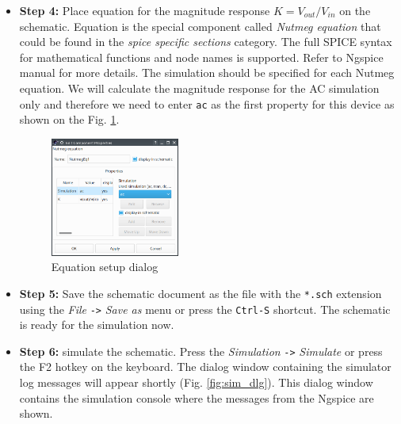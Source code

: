 \documentclass[a4paper,12pt]{article}
\begin{document}
\begin{itemize}
 \item \textbf{Step 4:} Place equation for the magnitude response $K=V_{out}/V_{in}$ on the schematic. Equation is the special component called \emph{Nutmeg equation} that could be found in the \emph{spice specific sections} category. The full SPICE syntax for mathematical functions and node names is supported. Refer to Ngspice manual for more details. The simulation should be specified for each Nutmeg equation. We will calculate the magnitude response for the AC simulation only and therefore we need to enter \verb|ac| as the first property for this device as shown on the Fig. \ref{fig:eq}.
  \begin{figure}[!ht]
  \begin{center}
    \includegraphics[width=0.4\textwidth]{img/nutmeg_eq.png}
  \end{center}
  \caption{Equation setup dialog} \label{fig:eq}
\end{figure}
 
 \item \textbf{Step 5:} Save the schematic document as the file with the \verb|*.sch| extension using the \textit{File} \verb|->| \textit{Save as} menu or press the \verb|Ctrl-S| shortcut. The schematic is ready for the simulation now.
 
 \item \textbf{Step 6:} simulate the schematic. Press the \textit{Simulation} \verb|->| \textit{Simulate} or press the F2 hotkey on the keyboard. The dialog window containing the simulator log messages will appear shortly (Fig. \ref{fig:sim_dlg}). This dialog window contains the simulation console where the messages from the Ngspice are shown. 
 

\end{itemize}
\end{document}
